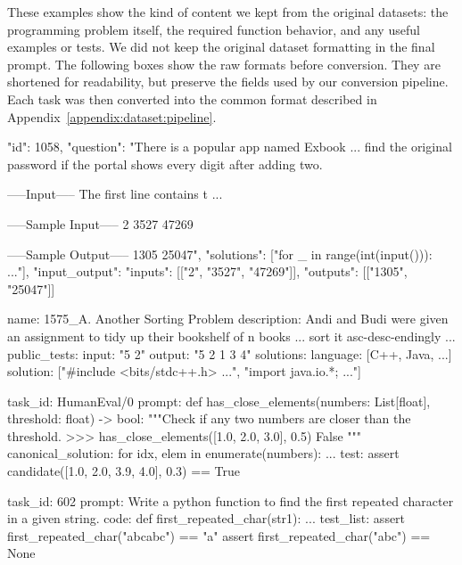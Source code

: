 These examples show the kind of content we kept from the original datasets:
the programming problem itself, the required function behavior, and any useful
examples or tests. We did not keep the original dataset formatting in the final
prompt. The following boxes show the raw formats before conversion. They are
shortened for readability, but preserve the fields used by our conversion
pipeline. Each task was then converted into the common format described in
Appendix~\ref{appendix:dataset:pipeline}.

\begin{PromptBox}
{
  "id": 1058,
  "question": "There is a popular app named Exbook ... find the
original password if the portal shows every digit after adding two.

-----Input-----
The first line contains t ...

-----Sample Input-----
2
3527
47269

-----Sample Output-----
1305
25047",
  "solutions": ["for _ in range(int(input())): ..."],
  "input_output": {"inputs": [["2", "3527", "47269"]],
                   "outputs": [["1305", "25047"]]}
}
\end{PromptBox}

\begin{PromptBox}
name: 1575_A. Another Sorting Problem
description: Andi and Budi were given an assignment to tidy up their
bookshelf of n books ... sort it asc-desc-endingly ...
public_tests:
  input:  "5 2\nAA\nAB\nBB\nBA\nAZ\n"
  output: "5 2 1 3 4\n"
solutions:
  language: [C++, Java, ...]
  solution: ["#include <bits/stdc++.h> ...", "import java.io.*; ..."]
\end{PromptBox}

\begin{PromptBox}
task_id: HumanEval/0
prompt:
  def has_close_elements(numbers: List[float], threshold: float) -> bool:
      """Check if any two numbers are closer than the threshold.
      >>> has_close_elements([1.0, 2.0, 3.0], 0.5)
      False
      """
canonical_solution:
  for idx, elem in enumerate(numbers):
      ...
test:
  assert candidate([1.0, 2.0, 3.9, 4.0], 0.3) == True
\end{PromptBox}

\begin{PromptBox}
task_id: 602
prompt: Write a python function to find the first repeated character
in a given string.
code:
  def first_repeated_char(str1):
      ...
test_list:
  assert first_repeated_char("abcabc") == "a"
  assert first_repeated_char("abc") == None
\end{PromptBox}

